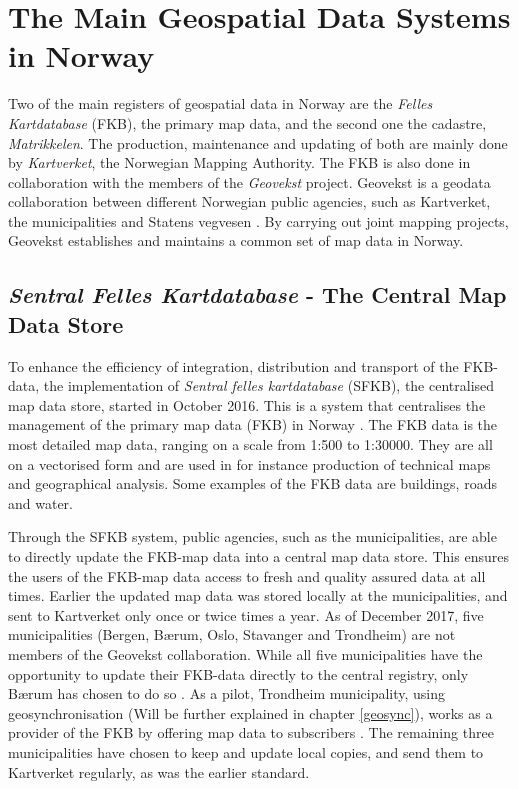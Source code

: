 

\chapter{The Main Geospatial Data Systems in Norway}\label{chap:examples}
Two of the main registers of geospatial data in Norway are the \textit{Felles Kartdatabase} (FKB), the primary map data,  and the second one the cadastre, \textit{Matrikkelen}. The production, maintenance and updating of both are mainly done by \textit{Kartverket}, the Norwegian Mapping Authority. The FKB is also done in collaboration with the members of the \textit{Geovekst} project. Geovekst is a geodata collaboration between different Norwegian public agencies, such as Kartverket, the municipalities and Statens vegvesen \citep{Kartverket2017a}. By carrying out joint mapping projects, Geovekst establishes and maintains a common set of map data in Norway. 

\section{\textit{Sentral Felles Kartdatabase} - The Central Map Data Store}\label{SFKB}
To enhance the efficiency of integration, distribution and transport of the FKB-data, the implementation of \textit{Sentral felles kartdatabase} (SFKB), the centralised map data store, started in October 2016. This is a system that centralises the management of the primary map data (FKB) in Norway \citep{Kartverket2017}. The FKB data is the most detailed map data, ranging on a scale from 1:500 to 1:30000. They are all on a vectorised form and are used in for instance production of technical maps and geographical analysis. Some examples of the FKB data are buildings, roads and water. 

Through the SFKB system, public agencies, such as the municipalities, are able to directly update the FKB-map data into a central map data store. This ensures the users of the FKB-map data access to fresh and quality assured data at all times. Earlier the updated map data was stored locally at the municipalities, and sent to Kartverket only once or twice times a year. As of December 2017, five municipalities (Bergen, Bærum, Oslo, Stavanger and Trondheim) are not members of the Geovekst collaboration. While all five municipalities have the opportunity to update their FKB-data directly to the central registry, only Bærum has chosen to do so \citep{Kartverket2017}. As a pilot, Trondheim municipality, using geosynchronisation (Will be further explained in chapter \ref{geosync}), works as a provider of the FKB by offering map data to subscribers \citep{Saether2016,Sandal2016}. The remaining three municipalities have chosen to keep and update local copies, and send them to Kartverket regularly, as was the earlier standard.

